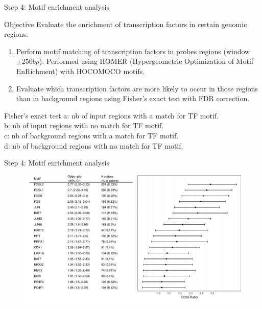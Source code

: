 \documentclass[slidestop,compress,11pt,xcolor=dvipsnames]{beamer}
\begin{document}
\begin{frame}{Step 4: Motif enrichment analysis}

\begin{block}{Objective}
Evaluate the enrichment of transcription factors in certain genomic regions.
\begin{enumerate}
  \item Perform motif matching of transcription factors in probes regions (window $\pm250bp$). Performed using HOMER (Hypergeometric Optimization of Motif EnRichment) with HOCOMOCO motifs.
  \item Evaluate which transcription factors are more likely to occur in those regions than in background regions
  using Fisher’s exact test with FDR correction.
\end{enumerate}
\end{block}
 \begin{exampleblock}{Fisher’s exact test}
 a: nb of input regions with a match for TF motif.\\
 b: nb of input regions with no match for TF motif.\\
 c: nb of background regions with a match for TF motif.\\
 d: nb of background regions with no match for TF motif.
 \end{exampleblock}

\end{frame}

\begin{frame}{Step 4: Motif enrichment analysis}
  \vspace{-0.5cm} 
  \begin{figure}
  \hspace*{-1cm} 
  \includegraphics[width=1.1\linewidth]{ELMER/motif_enrichment.pdf}
 \end{figure}
\end{frame}
\end{document}

